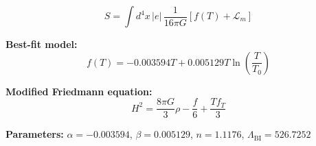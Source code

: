 
\begin{equation}
  S = \int d^4x \, |e| \, \frac{1}{16\pi G} \left[ f(T) + \mathcal{L}_m \right]
\end{equation}

\textbf{Best-fit model:}
\begin{equation}
  f(T) = -0.003594 T + 0.005129 T \ln\!\left(\frac{T}{T_0}\right)
\end{equation}

\textbf{Modified Friedmann equation:}
\begin{equation}
  H^2 = \frac{8\pi G}{3} \rho - \frac{f}{6} + \frac{T f_T}{3}
\end{equation}

\textbf{Parameters:}
$\alpha = -0.003594$, \quad
$\beta = 0.005129$, \quad
$n = 1.1176$, \quad
$\Lambda_{\text{BI}} = 526.7252$